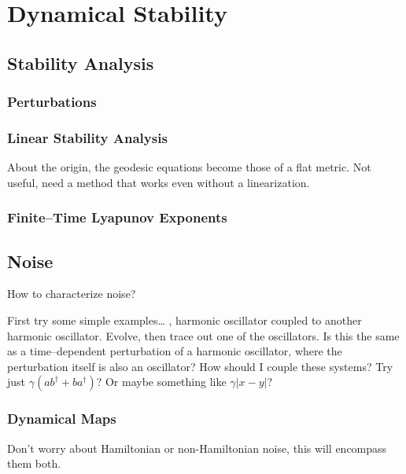 
\chapter{Dynamical Stability}
\label{chap:dynamicalStability}
%

\section{Stability Analysis}

\subsection{Perturbations}

\subsection{Linear Stability Analysis}

About the origin, the geodesic equations become those of a flat metric.
Not useful, need a method that works even without a linearization.

\subsection{Finite--Time Lyapunov Exponents}



\section{Noise}

How to characterize noise?

First try some simple examples\dots
\ie, harmonic oscillator coupled to another harmonic oscillator.
Evolve, then trace out one of the oscillators.  Is this the same as
a time--dependent perturbation of a harmonic oscillator, where the
perturbation itself is also an oscillator?  How should I couple these
systems?  Try just $\gamma\left( a b^\dagger + b a^\dagger\right)$?
Or maybe something like $\gamma\left| x-y\right|$?


\subsection{Dynamical Maps}

Don't worry about Hamiltonian or non-Hamiltonian noise, this will encompass
them both.

